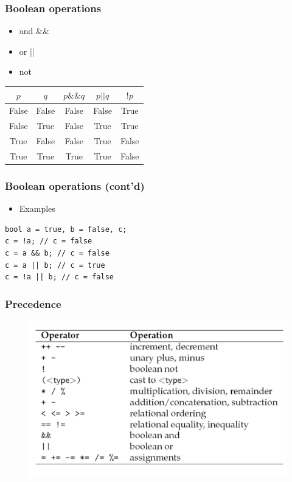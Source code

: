 \documentclass{../c-lecture}
\begin{document}
\begin{frame}
  \frametitle{Boolean operations}
  \begin{itemize}
    \item and \&\&
    \item or ||
    \item not \!
  \end{itemize}
  \begin{table}
  \begin{tabular}{ccccc}
    \toprule

    $p$ &
    $q$ &
    $p \&\& q$ &
    $p || q$ &
    $!p$ \\

    \midrule

    False &
    False &
    False &
    False &
    True \\

    \midrule

    False &
    True &
    False &
    True &
    True \\

    \midrule

    True &
    False &
    False &
    True &
    False \\

    \midrule

    True &
    True &
    True &
    True &
    False \\

    \bottomrule
  \end{tabular}
  \end{table}
\end{frame}

\begin{frame}[fragile]
  \frametitle{Boolean operations (cont’d)}
  \begin{itemize}
    \item Examples
  \end{itemize}
  \begin{verbatim}
bool a = true, b = false, c;
c = !a; // c = false
c = a && b; // c = false
c = a || b; // c = true
c = !a || b; // c = false
  \end{verbatim}
\end{frame}

\begin{frame}
  \frametitle{Precedence}
  \begin{figure}
    \includegraphics[width=.75\textwidth]{img/c-precedence.png}
  \end{figure}
\end{frame}
\end{document}
